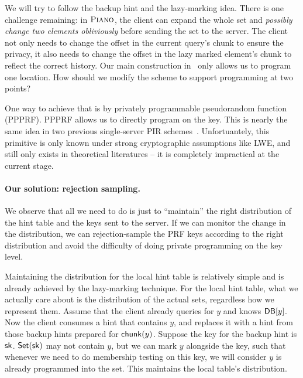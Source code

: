 We will try to follow the backup hint and the lazy-marking idea.
There is one challenge remaining: in $\textsc{Piano}$, the client can expand the whole set and \textit{possibly change two elements obliviously} before sending the set to the server. 
The client not only needs to change the offset in the current query's chunk to ensure the privacy, it also needs to change the offset in the lazy marked element's chunk to reflect the correct history. 
Our main construction in~ only allows us to program one location. 
How should we modify the scheme to support programming at two points?


One way to achieve that is by privately programmable
pseudorandom function (PPPRF). PPPRF allows us to directly program on the key.
This is nearly the same idea in
two previous single-server PIR schemes~\cite{pir-ec23,lazza-pir}.
Unfortuantely, this primitive is only known under strong cryptographic assumptions like LWE, and still only exists in theoretical literatures -- it is completely impractical at the current stage.

\paragraph{Our solution: rejection sampling.} 
We observe that all we need to do is just to ``maintain'' the right distribution
of the hint table and the keys sent to the server. 
If we can monitor the change in the distribution, we can rejection-sample
the PRF keys according to the right distribution and avoid the 
difficulty of doing private programming on the key level.

Maintaining the distribution for the local hint table is relatively simple and is already achieved by the lazy-marking technique.
For the local hint table, what we actually care about is the distribution of the
actual sets, regardless how we represent them. Assume that the client already
queries for $y$ and knows $\mathsf{DB}[y]$. Now the client consumes a hint that contains
$y$, and replaces it with a hint from those backup hints prepared for
$\mathsf{chunk}(y)$. Suppose the key for the backup hint is $\mathsf{sk}$. $\mathsf{Set}(\mathsf{sk})$ may not contain
$y$, but we can mark $y$ alongside the key, such that whenever we need to do membership testing on this key, we will consider $y$ is already programmed into the set.
This maintains the local table's distribution.

